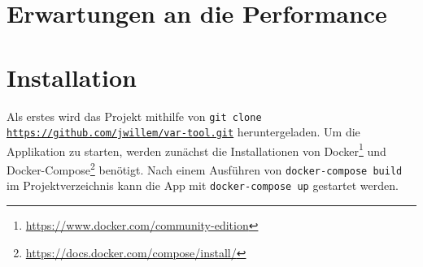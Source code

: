 \section{Erwartungen an die Performance}
\section{Installation}
Als erstes wird das Projekt mithilfe von \texttt{git clone \url{https://github.com/jwillem/var-tool.git}} heruntergeladen.
Um die Applikation zu starten, werden zunächst die Installationen von Docker\footnote{\url{https://www.docker.com/community-edition}} und Docker-Compose\footnote{\url{https://docs.docker.com/compose/install/}} benötigt.
Nach einem Ausführen von \texttt{docker-compose build} im Projektverzeichnis kann die App mit \texttt{docker-compose up} gestartet werden.

